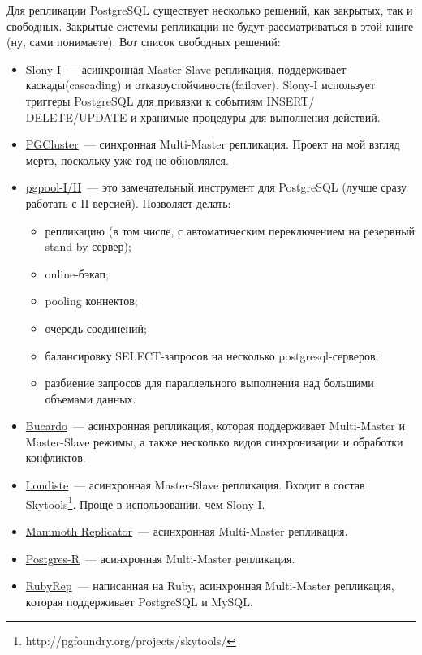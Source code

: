 Для репликации PostgreSQL существует несколько решений, как закрытых, так и свободных. 
Закрытые системы репликации не будут рассматриваться в этой книге (ну, сами понимаете). Вот список свободных решений:
\begin{itemize}
\item \href{http://www.slony.info/}{Slony-I}~--- асинхронная Master-Slave репликация, 
поддерживает каскады(cascading) и отказоустойчивость(failover). 
Slony-I использует триггеры PostgreSQL для привязки к событиям INSERT/ DELETE/UPDATE и хранимые 
процедуры для выполнения действий. 

\item \href{http://pgfoundry.org/projects/pgcluster/}{PGCluster}~--- синхронная Multi-Master репликация. 
Проект на мой взгляд мертв, поскольку уже год не обновлялся.

\item \href{http://pgpool.projects.postgresql.org/}{pgpool-I/II}~--- это замечательный инструмент для 
PostgreSQL (лучше сразу работать с II версией). Позволяет делать:
\begin{itemize}
\item репликацию (в том числе, с автоматическим переключением на резервный stand-by сервер);
\item online-бэкап;
\item pooling коннектов;
\item очередь соединений;
\item балансировку SELECT-запросов на несколько postgresql-серверов;
\item разбиение запросов для параллельного выполнения над большими объемами данных.
\end{itemize}

\item \href{http://bucardo.org/}{Bucardo}~--- асинхронная репликация, которая поддерживает Multi-Master и Master-Slave режимы, 
а также несколько видов синхронизации и обработки конфликтов. 

\item \href{http://skytools.projects.postgresql.org/doc/londiste.ref.html}{Londiste}~--- асинхронная Master-Slave 
репликация. Входит в состав Skytools\footnote{http://pgfoundry.org/projects/skytools/}. Проще в использовании, чем Slony-I.

\item \href{http://www.commandprompt.com/products/mammothreplicator/}{Mammoth Replicator}~--- асинхронная 
Multi-Master репликация. 

\item \href{http://www.postgres-r.org/}{Postgres-R}~--- асинхронная Multi-Master репликация.

\item \href{http://www.rubyrep.org/}{RubyRep}~--- написанная на Ruby, асинхронная Multi-Master 
репликация, которая поддерживает PostgreSQL и MySQL.
\end{itemize}

